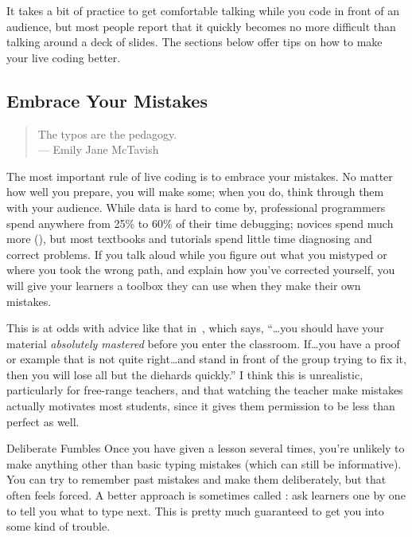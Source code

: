 It takes a bit of practice to get comfortable
talking while you code in front of an audience,
but most people report that it quickly becomes no more difficult than talking around a deck of slides.
The sections below offer tips on how to make your live coding better.

\subsection*{Embrace Your Mistakes}

\begin{quote}

  The typos are the pedagogy. \\
  --- Emily Jane McTavish

\end{quote}

The most important rule of live coding is to embrace your mistakes.
No matter how well you prepare,
you will make some;
when you do,
think through them with your audience.
While data is hard to come by,
professional programmers spend anywhere from 25\% to 60\% of their time debugging;
novices spend much more (),
but most textbooks and tutorials spend little time diagnosing and correct problems.
If you talk aloud while you figure out what you mistyped
or where you took the wrong path,
and explain how you've corrected yourself,
you will give your learners a toolbox they can use when they make their own mistakes.

This is at odds with advice like that in~\cite{Kran2015},
which says,
``{\ldots}you should have your material \emph{absolutely mastered} before you enter the classroom.
If{\ldots}you have a proof or example that is not quite right{\ldots}and stand in front of the group trying to fix it,
then you will lose all but the diehards quickly.''
I think this is unrealistic,
particularly for free-range teachers,
and that watching the teacher make mistakes actually motivates most students,
since it gives them permission to be less than perfect as well.

\begin{aside}{Deliberate Fumbles}
  Once you have given a lesson several times,
  you're unlikely to make anything other than basic typing mistakes
  (which can still be informative).
  You can try to remember past mistakes and make them deliberately,
  but that often feels forced.
  A better approach is sometimes called :
  ask learners one by one to tell you what to type next.
  This is pretty much guaranteed to get you into some kind of trouble.
\end{aside}

